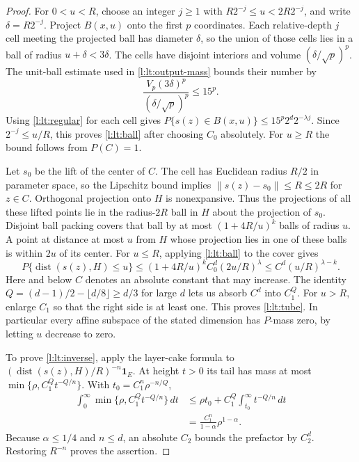 \begin{proof}
For $0<u<R$, choose an integer $j\ge1$ with
$R2^{-j}\le u<2R2^{-j}$, and write $\delta=R2^{-j}$.
Project $B(x,u)$ onto the first $p$ coordinates.  Each relative-depth
$j$ cell meeting the projected ball has diameter $\delta$, so the
union of those cells lies in a ball of radius $u+\delta<3\delta$.
The cells have disjoint interiors and volume
$(\delta/\sqrt p)^p$.  The unit-ball estimate used in
\eqref{l:lt:output-mass} bounds their number by
\[
 \frac{V_p(3\delta)^p}{(\delta/\sqrt p)^p}\le15^p.
\]
Using \eqref{l:lt:regular} for each cell gives
$P\{s(z)\in B(x,u)\}\le15^p2^d2^{-\lambda j}$.
Since $2^{-j}\le u/R$, this proves \eqref{l:lt:ball} after choosing
$C_0$ absolutely.  For $u\ge R$ the bound follows from $P(C)=1$.

Let $s_0$ be the lift of the center of $C$.  The cell has Euclidean
radius $R/2$ in parameter space, so the Lipschitz bound implies
$\|s(z)-s_0\|\le R\le2R$ for $z\in C$.  Orthogonal projection onto
$H$ is nonexpansive.  Thus the projections of all these lifted points
lie in the radius-$2R$ ball in $H$ about the projection of $s_0$.
Disjoint ball packing covers that ball by at most
$(1+4R/u)^k$ balls of radius $u$.  A point at distance at most $u$
from $H$ whose projection lies in one of these balls is within $2u$
of its center.  For $u\le R$, applying \eqref{l:lt:ball} to the cover
gives
\[
 P\{\operatorname{dist}(s(z),H)\le u\}
 \le (1+4R/u)^k C_0^d(2u/R)^\lambda
 \le C^d(u/R)^{\lambda-k}.
\]
Here and below $C$ denotes an absolute constant that may increase.
The identity
$Q=(d-1)/2-\lfloor d/8\rfloor\ge d/3$ for large $d$ lets us absorb
$C^d$ into $C_1^Q$.  For $u>R$, enlarge $C_1$ so that the right side
is at least one.  This proves \eqref{l:lt:tube}.  In particular every
affine subspace of the stated dimension has $P$-mass zero, by letting
$u$ decrease to zero.

To prove \eqref{l:lt:inverse}, apply the layer-cake formula to
$(\operatorname{dist}(s(z),H)/R)^{-n}\mathbf 1_E$.  At height $t>0$
its tail has mass at most
$\min\{\rho,C_1^Qt^{-Q/n}\}$.  With
$t_0=C_1^n\rho^{-n/Q}$,
\begin{align*}
 \int_0^\infty\min\{\rho,C_1^Qt^{-Q/n}\}\,dt
 &\le \rho t_0+C_1^Q\int_{t_0}^\infty t^{-Q/n}\,dt\\
 &=\frac{C_1^n}{1-\alpha}\rho^{1-\alpha}.
\end{align*}
Because $\alpha\le1/4$ and $n\le d$, an absolute $C_2$ bounds the
prefactor by $C_2^d$.  Restoring $R^{-n}$ proves the assertion.


\end{proof}
